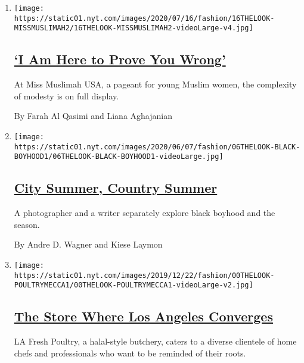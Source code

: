 \begin{enumerate}
\def\labelenumi{\arabic{enumi}.}
\item
  \texttt{[image: https://static01.nyt.com/images/2020/07/16/fashion/16THELOOK-MISSMUSLIMAH2/16THELOOK-MISSMUSLIMAH2-videoLarge-v4.jpg]}

  \hypertarget{i-am-here-to-prove-you-wrong}{%
  \subsection{\texorpdfstring{\href{/2020/07/04/style/muslim-beauty-pageant-miss-muslimah-usa.html}{`I
  Am Here to Prove You
  Wrong'}}{`I Am Here to Prove You Wrong'}}\label{i-am-here-to-prove-you-wrong}}

  At Miss Muslimah USA, a pageant for young Muslim women, the complexity
  of modesty is on full display.

  By Farah Al Qasimi and Liana Aghajanian
\item
  \texttt{[image: https://static01.nyt.com/images/2020/06/07/fashion/06THELOOK-BLACK-BOYHOOD1/06THELOOK-BLACK-BOYHOOD1-videoLarge.jpg]}

  \hypertarget{city-summer-country-summer}{%
  \subsection{\texorpdfstring{\href{/2020/06/06/style/city-summer-country-summer.html}{City
  Summer, Country
  Summer}}{City Summer, Country Summer}}\label{city-summer-country-summer}}

  A photographer and a writer separately explore black boyhood and the
  season.

  By Andre D. Wagner and Kiese Laymon
\item
  \texttt{[image: https://static01.nyt.com/images/2019/12/22/fashion/00THELOOK-POULTRYMECCA1/00THELOOK-POULTRYMECCA1-videoLarge-v2.jpg]}

  \hypertarget{the-store-where-los-angeles-converges}{%
  \subsection{\texorpdfstring{\href{/2019/12/21/style/la-fresh-poultry-immigrant-family-recipes.html}{The
  Store Where Los Angeles
  Converges}}{The Store Where Los Angeles Converges}}\label{the-store-where-los-angeles-converges}}

  LA Fresh Poultry, a halal-style butchery, caters to a diverse
  clientele of home chefs and professionals who want to be reminded of
  their roots.


\end{enumerate}
